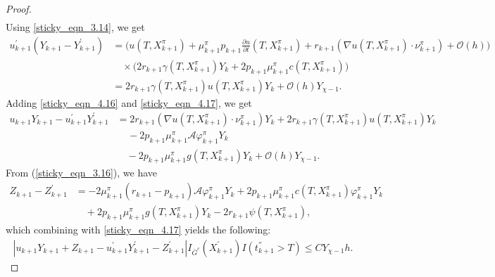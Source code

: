 \documentclass{article}
\theoremstyle{definition}
\numberwithin{equation}{section}
\begin{document}
\begin{proof}
\begin{align}
\end{align}
Using \eqref{sticky_eqn_3.14}, we get
\begin{align}
    u^{'}_{k+1}(Y_{k+1} - Y_{k+1}^{'}) & = \Big(u(T, X_{k+1}^{\pi}) + \mu^{\pi}_{k+1}p_{k+1}\frac{\partial u}{\partial t}(T, X^{\pi}_{k+1}) + r_{k+1}(\nabla u(T, X^{\pi}_{k+1}) \cdot \nu_{k+1}^{\pi}) + \mathcal{O}(h)\Big) \nonumber
    \\  & \quad \times  \big(2r_{k+1}\gamma(T, X^{\pi}_{k+1}) Y_k   + 2p_{k+1}\mu_{k+1}^{\pi}c(T, X_{k+1}^{\pi}) \big)    \nonumber 
    \\  & =  2r_{k+1}\gamma(T, X^{\pi}_{k+1}) u(T, X_{k+1}^{\pi})Y_k + \mathcal{O}(h)Y_{\chi-1}. \label{sticky_eqn_4.17}
\end{align}
Adding \eqref{sticky_eqn_4.16} and \eqref{sticky_eqn_4.17}, we get
\begin{align}
    u_{k+1}Y_{k+1} - u_{k+1}^{'} Y_{k+1}^{'} &= 2r_{k+1}(\nabla u(T, X^{\pi}_{k+1}) \cdot \nu_{k+1}^{\pi})  Y_{k} + 2r_{k+1}\gamma(T, X^{\pi}_{k+1}) u(T, X_{k+1}^{\pi})Y_k  \nonumber \\   & \;\;\;\; -  2 p_{k+1}\mu^{\pi}_{k+1}\mathcal{A}\varphi^{\pi}_{k+1} Y_{k}
     \nonumber \\  & \quad 
     -  2 p_{k+1}\mu^{\pi}_{k+1} g(T, X^{\pi}_{k+1})Y_{k} + \mathcal{O}(h)Y_{\chi-1}. \label{sticky_eqn_4.17}
\end{align}
From (\ref{sticky_eqn_3.16}), we have
\begin{align}
    Z_{k+1} - Z_{k+1}^{'} &= -2\mu_{k+1}^{\pi}(r_{k+1} - p_{k+1})\mathcal{A}\varphi^{\pi}_{k+1}Y_{k} +2 p_{k+1}\mu^{\pi}_{k+1} c(T, X^{\pi}_{k+1}) \varphi^{\pi}_{k+1}Y_{k} \nonumber  \\  & \quad + 2 p_{k+1}\mu^{\pi}_{k+1} g(T, X^{\pi}_{k+1})Y_{k} - 2r_{k+1}\psi(T, X^{\pi}_{k+1}),
\end{align}
which combining with \eqref{sticky_eqn_4.17} yields the following:
\begin{align*}
    |u_{k+1}Y_{k+1} + Z_{k+1} - u_{k+1}^{'}Y_{k+1}^{'} - Z_{k+1}^{'}   |I_{\bar{G}^{c}}(X_{k+1}^{'})I(t^{''}_{k+1} > T) \leq CY_{\chi-1}h.
\end{align*}

\end{proof}
\end{document}
